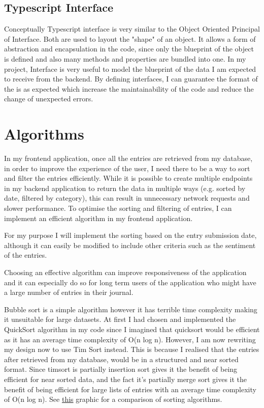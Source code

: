 \subsection{Typescript Interface}
Conceptually Typescript interface is very similar to the Object Oriented Principal of Interface. Both are used to layout the "shape" of an object. It allows a form of abstraction and encapsulation in the code, since only the blueprint of the object is defined and also many methods and properties are bundled into one. In my project, Interface is very useful to model the blueprint of the data I am expected to receive from the backend. By defining interfaces, I can guarantee the format of the is as expected which increase the maintainability of the code and reduce the change of unexpected errors.


\section{Algorithms}
In my frontend application, once all the entries are retrieved from my database, in order to improve the experience of the user, I need there to be a way to sort and filter the entries efficiently. While it is possible to create multiple endpoints in my backend application to return the data in multiple ways (e.g. sorted by date, filtered by category), this can result in unnecessary network requests and slower performance. To optimise the sorting and filtering of entries, I can implement an efficient algorithm in my frontend application.

For my purpose I will implement the sorting based on the entry submission date, although it can easily be modified to include other criteria such as the sentiment of the entries.

Choosing an effective algorithm can improve responsiveness of the application and it can especially do so for long term users of the application who might have a large number of entries in their journal.

Bubble sort is a simple algorithm however it has terrible time complexity making it unsuitable for large datasets. At first I had chosen and implemented the QuickSort algorithm in my code since I imagined that quicksort would be efficient as it has an average time complexity of O(n log n). However, I am now rewriting my design now to use Tim Sort instead. This is because I realised that the entries after retrieved from my database, would be in a structured and near sorted format. Since timsort is partially insertion sort gives it the benefit of being efficient for near sorted data, and the fact it's partially merge sort gives it the benefit of being efficient for large lists of entries with an average time complexity of O(n log n). See \href{https://www.toptal.com/developers/sorting-algorithms}{this} graphic for a comparison of sorting algorithms.

